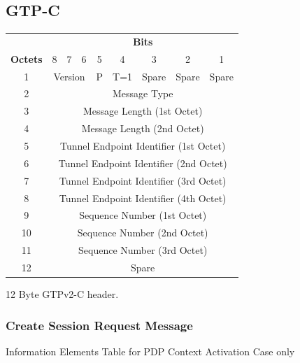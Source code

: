 \subsection{GTP-C}

\begin{tabular}{c|c|c|c|c|c|c|c|c|}
\multicolumn{1}{c}{} & \multicolumn{8}{c}{\textbf{Bits}} \\
\cline{2-9} \textbf{Octets} & 8 & 7 & 6 & 5 & 4 & 3 & 2 & 1 \\ 
\cline{2-9} 1 & \multicolumn{3}{c|}{Version}  & P & T=1 & Spare & Spare & Spare \\ 
\cline{2-9} 2 & \multicolumn{8}{c|}{Message Type}  \\ 
\cline{2-9} 3 & \multicolumn{8}{c|}{Message Length (1st Octet)}  \\ 
\cline{2-9} 4 & \multicolumn{8}{c|}{Message Length (2nd Octet)}  \\ 
\cline{2-9} 5 & \multicolumn{8}{c|}{Tunnel Endpoint Identifier (1st Octet)} \\ 
\cline{2-9} 6 & \multicolumn{8}{c|}{Tunnel Endpoint Identifier (2nd Octet)} \\ 
\cline{2-9} 7 & \multicolumn{8}{c|}{Tunnel Endpoint Identifier (3rd Octet)} \\ 
\cline{2-9} 8 & \multicolumn{8}{c|}{Tunnel Endpoint Identifier (4th Octet)} \\ 
\cline{2-9} 9 & \multicolumn{8}{c|}{Sequence Number (1st Octet)} \\
\cline{2-9} 10 & \multicolumn{8}{c|}{Sequence Number (2nd Octet)} \\
\cline{2-9} 11 & \multicolumn{8}{c|}{Sequence Number (3rd Octet)} \\
\cline{2-9} 12 & \multicolumn{8}{c|}{Spare} \\
\cline{2-9}
\end{tabular} 

12 Byte GTPv2-C header.

\subsubsection{Create Session Request Message}

Information Elements Table for PDP Context Activation Case only

